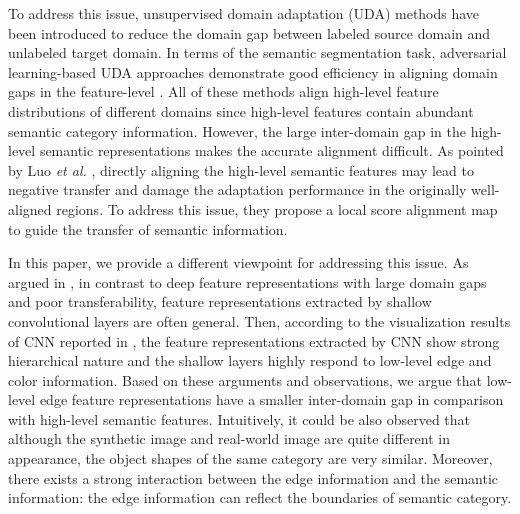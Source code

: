 \documentclass[sigconf]{acmart}
\begin{document}
\par To address this issue, unsupervised domain adaptation (UDA) methods have been introduced to reduce the domain gap between labeled source domain and unlabeled target domain. In terms of the semantic segmentation task, adversarial learning-based UDA approaches demonstrate good efficiency in aligning domain gaps in the feature-level \cite{hoffman2016fcns,tsai2018learning,vu2019advent,luo2019taking,yu2021dast}. All of these methods align high-level feature distributions of different domains since high-level features contain abundant semantic category information. However, the large inter-domain gap in the high-level semantic representations makes the accurate alignment difficult. As pointed by Luo \emph{et al.} \cite{luo2019taking}, directly aligning the high-level semantic features may lead to negative transfer and damage the adaptation performance in the originally well-aligned regions. To address this issue, they propose a local score alignment map to guide the transfer of semantic information. 

\par In this paper, we provide a different viewpoint for addressing this issue. As argued in \cite{long2015learning}, in contrast to deep feature representations with large domain gaps and poor transferability, feature representations extracted by shallow convolutional layers are often general. Then, according to the visualization results of CNN reported in \cite{zeiler2014visualizing}, the feature representations extracted by CNN show strong hierarchical nature and the shallow layers highly respond to low-level edge and color information. Based on these arguments and observations, we argue that low-level edge feature representations have a smaller inter-domain gap in comparison with high-level semantic features. Intuitively, it could be also observed that although the synthetic image and real-world image are quite different in appearance, the object shapes of the same category are very similar. Moreover, there exists a strong interaction between the edge information and the semantic information: the edge information can reflect the boundaries of semantic category. 
\end{document}
